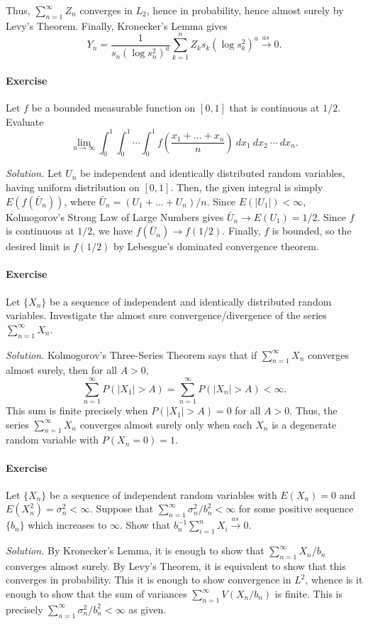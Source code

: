 \documentclass[10pt]{article}
\newcounter{prob}
\newcommand{\problem}{\stepcounter{prob}\paragraph{Exercise \arabic{prob}}}
\newcommand{\solution}{\textit{Solution.} }
\newcommand{\toas}{\overset{as\,}{\longrightarrow}}
\begin{document}
    Thus, $\sum_{n = 1}^\infty Z_n$ converges in $L_2$, hence in probability, hence
    almost surely by Levy's Theorem. Finally, Kronecker's Lemma gives \[
        Y_n = \frac{1}{s_n(\log{s_n^2})^a}\sum_{k = 1}^n Z_k s_k(\log{s_k^2})^a \toas
        0.
    \]


    \problem Let $f$ be a bounded measurable function on $[0, 1]$ that is continuous
    at $1/2$. Evaluate \[
        \lim_{n \to \infty} \int_0^1\int_0^1\cdots\int_0^1 f\left(\frac{x_1 + \dots +
        x_n}{n}\right)\:dx_1\:dx_2\:\cdots\:dx_n.
    \]

    \solution Let $U_n$ be independent and identically distributed random variables,
    having uniform distribution on $[0, 1]$. Then, the given integral is simply
    $E(f(\bar{U}_n))$, where $\bar{U}_n = (U_1 + \dots + U_n) / n$. Since $E(|U_1|) <
    \infty$, Kolmogorov's Strong Law of Large Numbers gives $\bar{U}_n \to E(U_1) =
    1/2$. Since $f$ is continuous at $1/2$, we have $f(\bar{U}_n) \to f(1/2)$.
    Finally, $f$ is bounded, so the desired limit is $f(1/2)$ by Lebesgue's dominated
    convergence theorem.


    \problem Let $\{X_n\}$ be a sequence of independent and identically distributed
    random variables. Investigate the almost sure convergence/divergence of the
    series $\sum_{n = 1}^\infty X_n$.

    \solution Kolmogorov's Three-Series Theorem says that if $\sum_{n = 1}^\infty
    X_n$ converges almost surely, then for all $A > 0$, \[
        \sum_{n = 1}^\infty P(|X_1| > A) = \sum_{n = 1}^\infty P(|X_n| > A) < \infty.
    \] This sum is finite precisely when $P(|X_1| > A) = 0$ for all $A > 0$. Thus,
    the series $\sum_{n = 1}^\infty X_n$ converges almost surely only when each $X_n$
    is a degenerate random variable with $P(X_n = 0) = 1$.


    \problem Let $\{X_n\}$ be a sequence of independent random variables with $E(X_n)
    = 0$ and $E(X_n^2) = \sigma_n^2 < \infty$. Suppose that $\sum_{n = 1}^\infty
    \sigma_n^2 / b_n^2 < \infty$ for some positive sequence $\{b_n\}$ which increases
    to $\infty$. Show that $b_n^{-1} \sum_{i = 1}^n X_i \toas 0$.

    \solution By Kronecker's Lemma, it is enough to show that $\sum_{n = 1}^\infty
    X_n / b_n$ converges almost surely. By Levy's Theorem, it is equivalent to show
    that this converges in probability. This it is enough to show convergence in
    $L^2$, whence is it enough to show that the sum of variances $\sum_{n = 1}^\infty
    V(X_n / b_n)$ is finite. This is precisely $\sum_{n = 1}^\infty \sigma_n^2 /
    b_n^2 < \infty$ as given.
\end{document}
